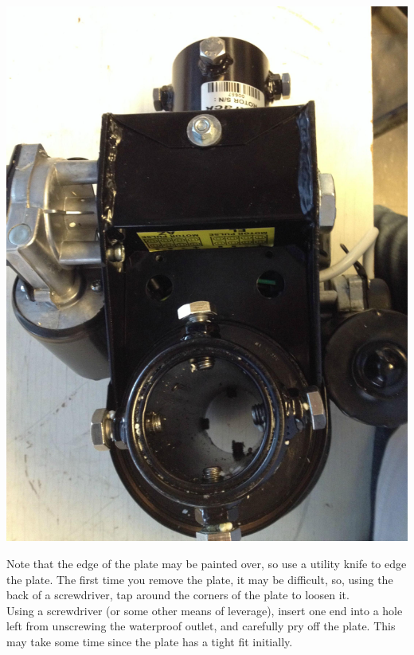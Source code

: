 \documentclass[11pt]{article} %
\begin{document}
\begin{center}
\includegraphics[scale=0.10]{wiring/03.jpeg}
\end{center}


Note that the edge of the plate may be painted over, so use a utility knife to edge the plate. The first time you remove the plate, it may be difficult, so, using the back of a screwdriver, tap around the corners of the plate to loosen it. \\
Using a screwdriver (or some other means of leverage), insert one end into a hole left from unscrewing the waterproof outlet, and carefully pry off the plate. This may take some time since the plate has a tight fit initially.
\end{document}
